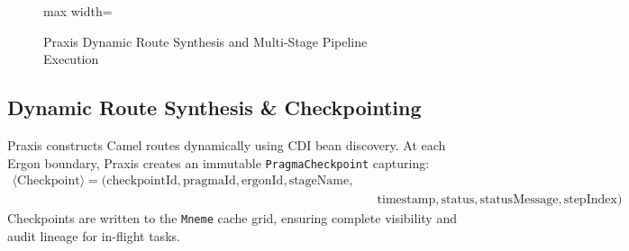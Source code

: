 \begin{figure}[htbp]
    \centering
    \begin{adjustbox}{max width=\textwidth}
        
    \end{adjustbox}
    \caption{Praxis Dynamic Route Synthesis and Multi-Stage Pipeline Execution}
    \label{fig:energeia_praxis_architecture}
\end{figure}

\subsection{Dynamic Route Synthesis \& Checkpointing}
Praxis constructs Camel routes dynamically using CDI bean discovery. At each Ergon boundary, Praxis creates an immutable \texttt{PragmaCheckpoint} capturing:
\begin{equation}
\begin{aligned}
\langle\text{Checkpoint}\rangle = (\text{checkpointId}, \text{pragmaId}, \text{ergonId}, \text{stageName}, \\
                                  &\quad\text{timestamp}, \text{status}, \text{statusMessage}, \text{stepIndex})
\end{aligned}
\end{equation}
Checkpoints are written to the \texttt{Mneme} cache grid, ensuring complete visibility and audit lineage for in-flight tasks.

\newpage
